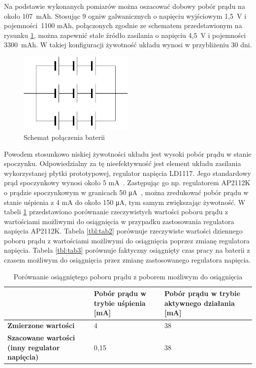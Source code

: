         Na podstawie wykonanych pomiarów można oszacować dobowy pobór prądu na około 107~mAh. Stosując 9 ogniw galwanicznych o napięciu wyjściowym 1,5~V i pojemności~1100 mAh, połączonych zgodnie ze schematem przedstawionym na rysunku \ref{fig:battery_layout}, można zapewnić stałe źródło zasilania o napięciu 4,5~V i pojemności 3300~mAh. W takiej konfiguracji żywotność układu wynosi w przybliżeniu 30 dni.

        \begin{figure}[]
            \centering
            \includegraphics[width=0.5\textwidth]{chapters/images/battery_layout.png}
            \caption{Schemat połączenia baterii}
            \label{fig:battery_layout}
        \end{figure}

        Powodem stosunkowo niskiej żywotności układu jest wysoki pobór prądu w stanie spoczynku. Odpowiedzialny za tę nieefektywność jest element układu zasilania wykorzystanej płytki prototypowej, regulator napięcia LD1117. Jego standardowy prąd spoczynkowy wynosi około 5 mA~\cite{AMS1117-ds}. Zastępując go np. regulatorem AP2112K o prądzie spoczynkowym w granicach 50 μA~\cite{AP2112K-ds}, można zredukować pobór prądu w stanie uśpienia z 4 mA do około 150 μA, tym samym zwiększając żywotność. W tabeli \ref{tbl:tab1} przedstawiono porównanie rzeczywistych wartości poboru prądu z wartościami możliwymi do osiągnięcia w przypadku zastosowania regulatora napięcia AP2112K. Tabela \ref{tbl:tab2} porównuje rzeczywiste wartości dziennego poboru prądu z wartościami możliwymi do osiągnięcia poprzez zmianę regulatora napięcia. Tabela \ref{tbl:tab3} porównuje faktyczny osiągnięty czas pracy na baterii z czasem możliwym do osiągnięcia przez zmianę zastosowanego regulatora napięcia.


        \begin{table}[]
            \caption{Porównanie osiągniętego poboru prądu z poborem możliwym do osiągnięcia}
            \centering
            \begin{tabular}{p{6cm}|p{4cm}|p{4cm} }
                    & \textbf{Pobór prądu w trybie uśpienia [mA]} & \textbf{Pobór prądu w trybie aktywnego działania [mA]} \\ \hline
             \textbf{Zmierzone wartości}
                      & 4 & 38 \\
            \hline
            \textbf{Szacowane wartości (inny regulator napięcia)} &  0,15 & 38  \\
            \end{tabular}
            \label{tbl:tab1}
            \vspace{10mm}           
        \end{table}

